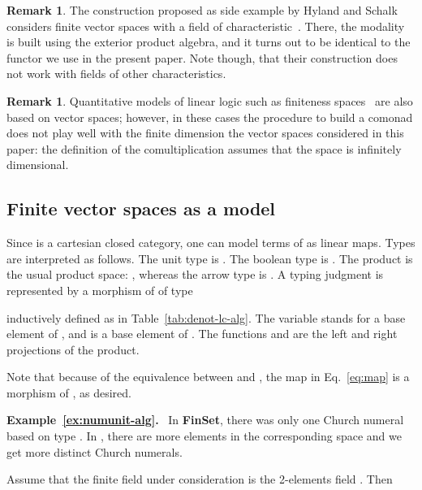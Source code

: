 \documentclass[10pt]{article}
\theoremstyle{plain}
\theoremstyle{definition}
\newtheorem{remark}[theorem]{Remark}
\newcommand{\FinSet}{\mbox{\bf FinSet}}
\begin{document}
\begin{remark}\label{rem:ext-prod}
  The construction proposed as side example by Hyland and Schalk~\cite{hyland03glueing} 
  considers finite vector spaces with a field of characteristic~. There,
  the modality is built using the exterior product algebra, and it turns out to
  be identical to the functor we use in the present paper. Note though,
  that their construction does not work with
  fields of other characteristics.
\end{remark}

\begin{remark}
  Quantitative models of linear logic such as finiteness
  spaces~\cite{finiteness} are also based on vector spaces;
  however, in these cases the procedure to build a comonad
  does not play well with the finite dimension the vector spaces
  considered in this paper: the definition of the comultiplication
  assumes that the space  is infinitely dimensional.
\end{remark}


\subsection{Finite vector spaces as a model}
\label{sec:lc-finvec-model}



Since  is a cartesian closed category, one can model
terms of  as linear maps. Types are interpreted as
follows. The unit type is . The boolean type is
. The product is the
usual product space: , whereas the arrow type is
.
A typing judgment  is represented
by a morphism of  of type

inductively defined as in Table~\ref{tab:denot-lc-alg}. The
variable  stands for a base element  of , and  is a base element of
. The functions  and  are the left and
right projections of the product.

  Note that because of the equivalence between  and
  , the map in Eq.~\eqref{eq:map} is a morphism of
  , as desired.


\label{ex:numunit-alg}\medskip
\noindent
{\bf Example~\ref{ex:numunit-alg}.}~
In {\FinSet}, there was only one Church numeral based on type
  . In , there are more elements in the
  corresponding space
   and we get more
  distinct Church numerals.

  Assume that the finite field under consideration is the 2-elements
  field . Then
  
\end{document}
